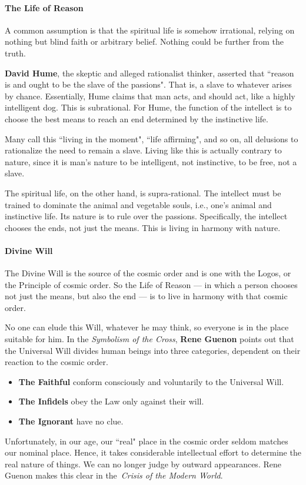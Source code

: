 \paragraph{The Life of Reason}
A common assumption is that the spiritual life is somehow irrational, relying on nothing but blind faith or arbitrary belief. Nothing could be further from the truth.

\textbf{David Hume}, the skeptic and alleged rationalist thinker, asserted that ``reason is and ought to be the slave of the passions". That is, a slave to whatever arises by chance. Essentially, Hume claims that man acts, and should act, like a highly intelligent dog. This is subrational. For Hume, the function of the intellect is to choose the best means to reach an end determined by the instinctive life.

Many call this ``living in the moment", ``life affirming", and so on, all delusions to rationalize the need to remain a slave. Living like this is actually contrary to nature, since it is man's nature to be intelligent, not instinctive, to be free, not a slave.

The spiritual life, on the other hand, is supra-rational. The intellect must be trained to dominate the animal and vegetable souls, i.e., one's animal and instinctive life. Its nature is to rule over the passions. Specifically, the intellect chooses the ends, not just the means. This is living in harmony with nature.

\paragraph{Divine Will}
The Divine Will is the source of the cosmic order and is one with the Logos, or the Principle of cosmic order. So the Life of Reason — in which a person chooses not just the means, but also the end — is to live in harmony with that cosmic order.

No one can elude this Will, whatever he may think, so everyone is in the place suitable for him. In the \emph{Symbolism of the Cross}, \textbf{Rene Guenon} points out that the Universal Will divides human beings into three categories, dependent on their reaction to the cosmic order.

\begin{itemize}
\item \textbf{The Faithful} conform consciously and voluntarily to the Universal Will. 
\item \textbf{The Infidels} obey the Law only against their will. 
\item \textbf{The Ignorant} have no clue. 
\end{itemize}
Unfortunately, in our age, our ``real" place in the cosmic order seldom matches our nominal place. Hence, it takes considerable intellectual effort to determine the real nature of things. We can no longer judge by outward appearances. Rene Guenon makes this clear in the \emph{Crisis of the Modern World}.

